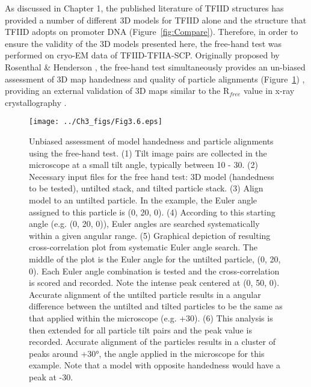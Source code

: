 As discussed in Chapter 1, the published literature of TFIID structures has provided a number of different 3D models for TFIID alone \cite{Elmlund_691,Leurent_1797,Leurent_1554,Papai_539} and the structure that TFIID adopts on promoter DNA \cite{Elmlund_691,Papai_418} (Figure~\ref{fig:Compare}). Therefore, in order to ensure the validity of the 3D models presented here, the free-hand test was performed on cryo-EM data of TFIID-TFIIA-SCP. Originally proposed by Rosenthal \& Henderson \cite{Rosenthal_2003}, the free-hand test simultaneously provides an un-biased assessment of 3D map handedness and quality of particle alignments (Figure~\ref{fig:Fig3.6}) \cite{Baker_2012,Henderson_2011,Lau_2010,Rosenthal_2003}, providing an external validation of 3D maps similar to the R$_{free}$ value in x-ray crystallography \cite{Brunger_1992}. \\
\begin{figure}
\centering
\texttt{[image: ../Ch3\_figs/Fig3.6.eps]}
\caption[Unbiased assessment of model handedness and particle alignments using the free-hand test]{Unbiased assessment of model handedness and particle alignments using the free-hand test. (1) Tilt image pairs are collected in the microscope at a small tilt angle, typically between 10 - 30\textdegree. (2) Necessary input files for the free hand test:  3D model (handedness to be tested), untilted stack, and tilted particle stack. (3) Align model to an untilted particle.  In the example, the Euler angle assigned to this particle is (0, 20, 0). (4) According to this starting angle (e.g. (0, 20, 0)), Euler angles are searched systematically within a given angular range.  (5) Graphical depiction of resulting cross-correlation plot from systematic Euler angle search.  The middle of the plot is the Euler angle for the untilted particle, (0, 20, 0).  Each Euler angle combination is tested and the cross-correlation is scored and recorded. Note the intense peak centered at (0, 50, 0). Accurate alignment of the untilted particle results in a angular difference between the untilted and tilted particles to be the same as that applied within the microscope (e.g. +30\textdegree). (6) This analysis is then extended for all particle tilt pairs and the peak value is recorded. Accurate alignment of the particles results in a cluster of peaks around +30°, the angle applied in the microscope for this example. Note that a model with opposite handedness would have a peak at -30\textdegree.}
\label{fig:Fig3.6}
\end{figure} 
 
